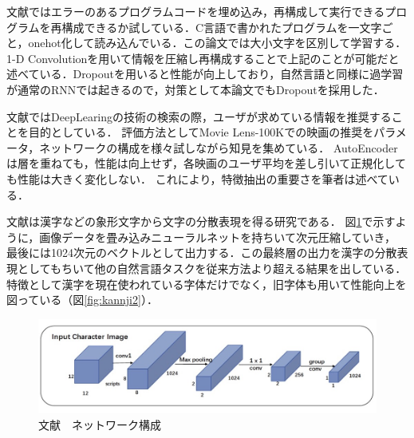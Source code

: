\documentclass[a4j,11pt,report]{jsbook}
\begin{document}
文献\cite{lannrenn4}ではエラーのあるプログラムコードを埋め込み，再構成して実行できるプログラムを再構成できるか試している．C言語で書かれたプログラムを一文字ごと，onehot化して読み込んでいる．この論文では大小文字を区別して学習する．1-D Convolutionを用いて情報を圧縮し再構成することで上記のことが可能だと述べている．Dropoutを用いると性能が向上しており，自然言語と同様に過学習が通常のRNNでは起きるので，対策として本論文でもDropoutを採用した．

文献\cite{kannrenn5}ではDeepLearingの技術の検索の際，ユーザが求めている情報を推奨することを目的としている．
評価方法としてMovie Lens-100Kでの映画の推奨をパラメータ，ネットワークの構成を様々試しながら知見を集めている．
AutoEncoderは層を重ねても，性能は向上せず，各映画のユーザ平均を差し引いて正規化しても性能は大きく変化しない．
これにより，特徴抽出の重要さを筆者は述べている．

文献\cite{glyce}は漢字などの象形文字から文字の分散表現を得る研究である．
図\ref{fig:kannji1}で示すように，画像データを畳み込みニューラルネットを持ちいて次元圧縮していき，
最後には1024次元のベクトルとして出力する．この最終層の出力を漢字の分散表現としてもちいて他の自然言語タスクを従来方法より超える結果を出している．特徴として漢字を現在使われている字体だけでなく，旧字体も用いて性能向上を図っている（図\ref{fig:kannji2}）．





\begin{center}
  \begin{figure}[H]
    \centering
    \includegraphics[width=\linewidth]{image/kannji1.jpeg}
    \caption{文献\cite{glyce}　ネットワーク構成}
    \label{fig:kannji1}
  \end{figure}
\end{center}
\end{document}
